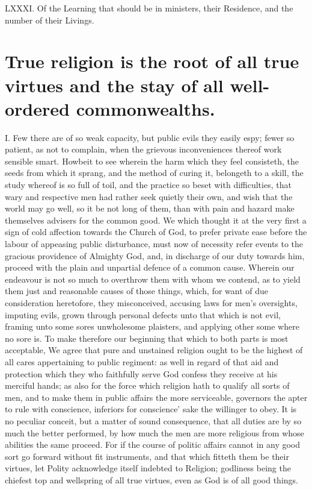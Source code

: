 LXXXI. Of the Learning that should be in ministers, their Residence, and the number of their Livings.


\section*{True religion is the root of all true virtues and the stay of all well-ordered commonwealths.}

I. Few there are of so weak capacity, but public evils they easily espy; fewer so patient, as not to complain, when the grievous inconveniences thereof work sensible smart. Howbeit to see wherein the harm which they feel consisteth, the seeds from which it sprang, and the method of curing it, belongeth to a skill, the study whereof is so full of toil, and the practice so beset with difficulties, that wary and respective men had rather seek quietly their own, and wish that the world may go well, so it be not long of them, than with pain and hazard make themselves advisers for the common good. We which thought it at the very first a sign of cold affection towards the Church of God, to prefer private ease before the labour of appeasing public disturbance, must now of necessity refer events to the gracious providence of Almighty God, and, in discharge of our duty towards him, proceed with the plain and unpartial defence of a common cause. Wherein our endeavour is not so much to overthrow them with whom we contend, as to yield them just and reasonable causes of those things, which, for want of due consideration heretofore, they misconceived, accusing laws for men’s oversights, imputing evils, grown through personal defects unto that which is not evil, framing unto some sores unwholesome plaisters, and applying other some where no sore is.
To make therefore our beginning that which to both parts is most acceptable, We agree that pure and unstained religion ought to be the highest of all cares appertaining to  public regiment: as well in regard of that aid and protection which they who faithfully serve God confess they receive at his merciful hands; as also for the force which religion hath to qualify all sorts of men, and to make them in public affairs the more serviceable, governors the apter to rule with conscience, inferiors for conscience’ sake the willinger to obey. It is no peculiar conceit, but a matter of sound consequence, that all duties are by so much the better performed, by how much the men are more religious from whose abilities the same proceed. For if the course of politic affairs cannot in any good sort go forward without fit instruments, and that which fitteth them be their virtues, let Polity acknowledge itself indebted to Religion; godliness being the chiefest top and wellspring of all true virtues, even as God is of all good things.
